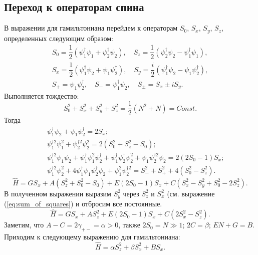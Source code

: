 \documentclass[12pt]{article}
\begin{document}
\subsection*{Переход к операторам спина}

В выражении для гамильтониана перейдем к операторам $S_0$, $S_x$, $S_y$, $S_z$, определенных следующим образом:
%
\begin{equation}
\begin{array}{c}
	S_0 = \dfrac{1}{2} (\psi_1^\dag \psi_1 + \psi_2^\dag \psi_2), \quad S_z = \dfrac{1}{2} (\psi_2^\dag \psi_2 - \psi_1^\dag \psi_1), \\[10pt]
	S_x = \dfrac{1}{2} (\psi_1^\dag \psi_2 + \psi_1 \psi_2^\dag), \quad S_y = \dfrac{i}{2} (\psi_1^\dag \psi_2 - \psi_1 \psi_2^\dag), \\[10pt]
	S_+ = \psi_1 \psi_2^\dag, \quad S_- = \psi_1^\dag \psi_2, \quad S_{\pm} = S_x \pm iS_y.
\end{array}
\end{equation}
%
Выполняется тождество:
%
\begin{equation}
S_0^2 + S_x^2 + S_y^2 + S_z^2 = \dfrac{1}{2}(N^2 + N) = Const.
\label{eq:sum_of_squares}
\end{equation}
%
Тогда
%
\begin{eqnarray*}
&& \psi_1^\dag \psi_2 + \psi_1 \psi_2^\dag = 2S_x; \\
&& \psi_1^{\dag 2} \psi_1^2 + \psi_2^{\dag 2} \psi_2^2 = 2(S_0^2 + S_z^2 - S_0); \\
&& \psi_1^{\dag 2} \psi_1 \psi_2 + \psi_1^\dag \psi_1^2 \psi_2^\dag + \psi_1^\dag \psi_2^\dag \psi_2^2 + \psi_1 \psi_2^{\dag 2} \psi_2 = 2(2S_0 - 1) S_x; \\
&& \psi_1^{\dag 2} \psi_2^2 + 4 \psi_1^\dag \psi_1 \psi_2^\dag \psi_2 + \psi_1^2 \psi_2^{\dag 2} = S_-^2 + S_+^2 + 4(S_0^2 - S_z^2).
\end{eqnarray*}
%
%
$$\hat{H} = G S_x + A(S_z^2 + S_0^2 - S_0) + E(2S_0 - 1) S_x + C(S_x^2 - S_y^2 + S_0^2 - 2S_z^2).$$
%
В полученном выражении выразим $S_y^2$ через $S_z^2$ и $S_x^2$ (см. выражение (\ref{eq:sum_of_squares}) и отбросим все постоянные.
%
$$\hat{H} = G S_x + A S_z^2 + E(2S_0 - 1) S_x + C(2 S_x^2 - S_z^2).$$
%
Заметим, что $A - C = 2 \gamma_{+-} = \alpha > 0$, также $2S_0 = N \gg 1$; $2C = \beta$; $EN+G = B$.
Приходим к следующему выражению для гамильтониана:
%
\begin{equation}
\hat{H} = \alpha S_z^2 + \beta S_x^2 + B S_x.
\label{eq:spin_hamiltonian}
\end{equation}
\end{document}
